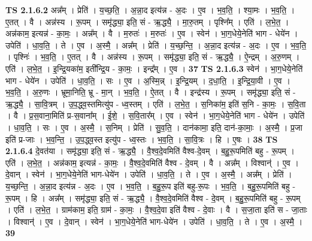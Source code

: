 \documentclass[17pt]{extarticle}
\begin{document}
                  \newline
                                \textbf{ TS 2.1.6.2} \newline
                  अन्न᳚म् । प्रेति॑ । य॒च्छ॒ति॒ । अ॒न्ना॒द इत्य॑न्न - अ॒दः । ए॒व । भ॒व॒ति॒ । श्या॒मः । भ॒व॒ति॒ । ए॒तत् । वै । अन्न॑स्य । रू॒पम् । समृ॑द्ध्या॒ इति॒ सं - ऋ॒द्ध्यै॒ । मा॒रु॒तम् । पृश्नि᳚म् । एति॑ । ल॒भे॒त॒ । अन्न॑काम॒ इत्यन्न॑ - का॒मः॒ । अन्न᳚म् । वै । म॒रुतः॑ । म॒रुतः॑ । ए॒व । स्वेन॑ । भा॒ग॒धेये॒नेति॑ भाग - धेये॑न । उपेति॑ । धा॒व॒ति॒ । ते । ए॒व । अ॒स्मै॒ । अन्न᳚म् । प्रेति॑ । य॒च्छ॒न्ति॒ । अ॒न्ना॒द इत्य॑न्न - अ॒दः । ए॒व । भ॒व॒ति॒ । पृश्निः॑ । भ॒व॒ति॒ । ए॒तत् । वै । अन्न॑स्य । रू॒पम् । समृ॑द्ध्या॒ इति॒ सं - ऋ॒द्ध्यै॒ । ऐ॒न्द्रम् । अ॒रु॒णम् । एति॑ । ल॒भे॒त॒ । इ॒न्द्रि॒यका॑म॒ इती᳚न्द्रि॒य - का॒मः॒ । इन्द्र᳚म् । ए॒व । \textbf{  37} \newline
                  \newline
                                \textbf{ TS 2.1.6.3} \newline
                  स्वेन॑ । भा॒ग॒धेये॒नेति॑ भाग - धेये॑न । उपेति॑ । धा॒व॒ति॒ । सः । ए॒व । अ॒स्मि॒न्न् । इ॒न्द्रि॒यम् । द॒धा॒ति॒ । इ॒न्द्रि॒या॒वी । ए॒व । भ॒व॒ति॒ । अ॒रु॒णः । भ्रूमा॒निति॒ भ्रू - मा॒न् । भ॒व॒ति॒ । ऐ॒तत् । वै । इन्द्र॑स्य । रू॒पम् । समृ॑द्ध्या॒ इति॒ सं - ऋ॒द्ध्यै॒ । सा॒वि॒त्रम् । उ॒प॒द्ध्व॒स्तमित्यु॑प - ध्व॒स्तम् । एति॑ । ल॒भे॒त॒ । स॒निका॑म॒ इति॑ स॒नि - का॒मः॒ । स॒वि॒ता । वै । प्र॒स॒वाना॒मिति॑ प्र-स॒वाना᳚म् । ई॒शे॒ । स॒वि॒तार᳚म् । ए॒व । स्वेन॑ । भा॒ग॒धेये॒नेति॑ भाग - धेये॑न । उपेति॑ । धा॒व॒ति॒ । सः । ए॒व । अ॒स्मै॒ । स॒निम् । प्रेति॑ । सु॒व॒ति॒ । दान॑कामा॒ इति॒ दान॑-का॒माः॒ । अ॒स्मै॒ । प्र॒जा इति॑ प्र-जाः । भ॒व॒न्ति॒ । उ॒प॒द्ध्व॒स्त इत्यु॑प - ध्व॒स्तः । भ॒व॒ति॒ । सा॒वि॒त्रः । हि । ए॒षः । \textbf{  38} \newline
                  \newline
                                \textbf{ TS 2.1.6.4} \newline
                  दे॒वत॑या । समृ॑द्ध्या॒ इति॒ सं - ऋ॒द्ध्यै॒ । वै॒श्व॒दे॒वमिति॑ वैश्व-दे॒वम् । ब॒हु॒रू॒पमिति॑ बहु - रू॒पम् । एति॑ । ल॒भे॒त॒ । अन्न॑काम॒ इत्यन्न॑ - का॒मः॒ । वै॒श्व॒दे॒वमिति॑ वैश्व - दे॒वम् । वै । अन्न᳚म् । विश्वान्॑ । ए॒व । दे॒वान् । स्वेन॑ । भा॒ग॒धेये॒नेति॑ भाग-धेये॑न । उपेति॑ । धा॒व॒ति॒ । ते । ए॒व । अ॒स्मै॒ । अन्न᳚म् । प्रेति॑ । य॒च्छ॒न्ति॒ । अ॒न्ना॒द इत्य॑न्न - अ॒दः । ए॒व । भ॒व॒ति॒ । ब॒हु॒रू॒प इति॑ बहु-रू॒पः । भ॒व॒ति॒ । ब॒हु॒रू॒पमिति॑ बहु - रू॒पम् । हि । अन्न᳚म् । समृ॑द्ध्या॒ इति॒ सं - ऋ॒द्ध्यै॒ । वै॒श्व॒दे॒वमिति॑ वैश्व - दे॒वम् । ब॒हु॒रू॒पमिति॑ बहु - रू॒पम् । एति॑ । ल॒भे॒त॒ । ग्राम॑काम॒ इति॒ ग्राम॑ - का॒मः॒ । वै॒श्व॒दे॒वा इति॑ वैश्व - दे॒वाः । वै । स॒जा॒ता इति॑ स - जा॒ताः । विश्वान्॑ । ए॒व । दे॒वान् । स्वेन॑ । भा॒ग॒धेये॒नेति॑ भाग-धेये॑न । उपेति॑ । धा॒व॒ति॒ । ते । ए॒व । अ॒स्मै॒ । \textbf{  39} \newline
\end{document}
